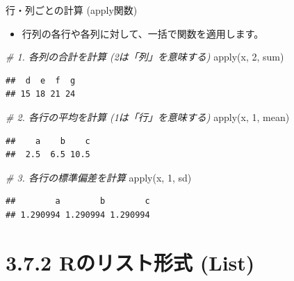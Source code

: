 \documentclass[
  ignorenonframetext,
]{beamer}
\newenvironment{Shaded}{\begin{snugshade}}{\end{snugshade}}
\newcommand{\CommentTok}[1]{\textcolor[rgb]{0.56,0.35,0.01}{\textit{#1}}}
\newcommand{\DecValTok}[1]{\textcolor[rgb]{0.00,0.00,0.81}{#1}}
\newcommand{\FunctionTok}[1]{\textcolor[rgb]{0.00,0.00,0.00}{#1}}
\newcommand{\NormalTok}[1]{#1}
\providecommand{\tightlist}{%
  \setlength{\itemsep}{0pt}\setlength{\parskip}{0pt}}
\begin{document}
\begin{frame}[fragile]{行・列ごとの計算 (apply関数)}
\protect\hypertarget{ux884cux5217ux3054ux3068ux306eux8a08ux7b97-applyux95a2ux6570}{}
\begin{itemize}
\tightlist
\item
  行列の各行や各列に対して、一括で関数を適用します。
\end{itemize}

\scriptsize

\begin{Shaded}
\begin{Highlighting}[]
\CommentTok{\# 1. 各列の合計を計算 (2は「列」を意味する)}
\FunctionTok{apply}\NormalTok{(x, }\DecValTok{2}\NormalTok{, sum) }
\end{Highlighting}
\end{Shaded}

\begin{verbatim}
##  d  e  f  g 
## 15 18 21 24
\end{verbatim}

\begin{Shaded}
\begin{Highlighting}[]
\CommentTok{\# 2. 各行の平均を計算 (1は「行」を意味する)}
\FunctionTok{apply}\NormalTok{(x, }\DecValTok{1}\NormalTok{, mean)}
\end{Highlighting}
\end{Shaded}

\begin{verbatim}
##    a    b    c 
##  2.5  6.5 10.5
\end{verbatim}

\begin{Shaded}
\begin{Highlighting}[]
\CommentTok{\# 3. 各行の標準偏差を計算}
\FunctionTok{apply}\NormalTok{(x, }\DecValTok{1}\NormalTok{, sd)}
\end{Highlighting}
\end{Shaded}

\begin{verbatim}
##        a        b        c 
## 1.290994 1.290994 1.290994
\end{verbatim}

\normalsize
\end{frame}

\hypertarget{rux306eux30eaux30b9ux30c8ux5f62ux5f0f-list}{%
\section{3.7.2 Rのリスト形式
(List)}\label{rux306eux30eaux30b9ux30c8ux5f62ux5f0f-list}}
\end{document}
